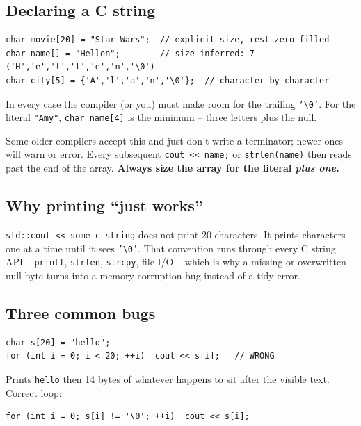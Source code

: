\documentclass[11pt]{article}
\begin{document}
\subsection{Declaring a C string}

\begin{examplebox}
\begin{verbatim}
char movie[20] = "Star Wars";  // explicit size, rest zero-filled
char name[] = "Hellen";        // size inferred: 7 ('H','e','l','l','e','n','\0')
char city[5] = {'A','l','a','n','\0'};  // character-by-character
\end{verbatim}
In every case the compiler (or you) must make room for the trailing
\texttt{'\textbackslash0'}. For the literal \texttt{"Amy"},
\texttt{char name[4]} is the minimum -- three letters plus the null.
\end{examplebox}

\begin{warnbox}[\texttt{char name[3] = "Amy";} silently drops the null]
Some older compilers accept this and just don't write a terminator;
newer ones will warn or error. Every subsequent \texttt{cout << name;}
or \texttt{strlen(name)} then reads past the end of the array.
\textbf{Always size the array for the literal \emph{plus one}.}
\end{warnbox}

\subsection{Why printing ``just works''}

\texttt{std::cout << some\_c\_string} does not print 20 characters. It
prints characters one at a time until it sees \texttt{'\textbackslash0'}.
That convention runs through every C string API -- \texttt{printf},
\texttt{strlen}, \texttt{strcpy}, file I/O -- which is why a missing or
overwritten null byte turns into a memory-corruption bug instead of a
tidy error.

\subsection{Three common bugs}

\begin{warnbox}
\begin{verbatim}
char s[20] = "hello";
for (int i = 0; i < 20; ++i)  cout << s[i];   // WRONG
\end{verbatim}
Prints \texttt{hello} then 14 bytes of whatever happens to sit after
the visible text. Correct loop:
\begin{verbatim}
for (int i = 0; s[i] != '\0'; ++i)  cout << s[i];
\end{verbatim}
\end{warnbox}
\end{document}
